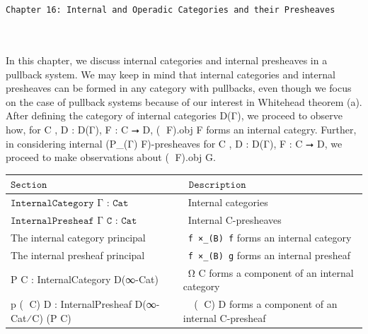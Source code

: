\documentclass{book}
\theoremstyle{definition}
\renewcommand{\chapter}[1]{
\newpage
{
\Huge 
\begin{center}
\ \\
\ \\
\thispagestyle{empty}
\texttt{#1}
\end{center}}
\ \\
\ \\
}
\begin{document}
\fi


\iffalse

\chapter{Chapter 16: Internal and Operadic Categories and their Presheaves}

In this chapter, we discuss internal categories and internal presheaves in a pullback system. We may keep in mind that internal categories and internal presheaves can be formed in any category with pullbacks, even though we focus on the case of pullback systems because of our interest in Whitehead theorem (a).\\

After defining the category of internal categories D(Γ), we proceed to observe how, for C , D : D(Γ), F : C ⭢ D, (ω⃗ F).obj F forms an internal categry. Further, in considering internal (P⃗\_(Γ) F)-presheaves for  C , D : D(Γ), F : C ⭢ D, we proceed to make observations about (ω⃗ F).obj G.\\

{
\footnotesize
\begin{center}
\begin{tabular}{||l || l ||} 
 \hline
 $\texttt{Section}$  &\ $\texttt{Description}$ \\
 \hline \hline
 $\texttt{InternalCategory Γ : Cat}$   &\ Internal categories \\ 
 \hline
 $\texttt{InternalPresheaf Γ C : Cat}$ &\ Internal C-presheaves \\ 
 \hline
 The internal category principal &\ \texttt{f ×\_(B) f} forms an internal category\\
 \hline
 The internal presheaf principal &\ \texttt{f ×\_(B) g} forms an internal presheaf\\
 \hline
 P⃗ C : InternalCategory D(∞-Cat) &\ Ω⃗ C forms a component of an internal category \\
 \hline
 p⃗ (𝟙 C) D : InternalPresheaf D(∞-Cat⁄C) (P⃗ C) &\ ω⃗ (𝟙 C) D forms a component of an internal C-presheaf \\
 \hline
\end{tabular}
\end{center}
}
\end{document}

